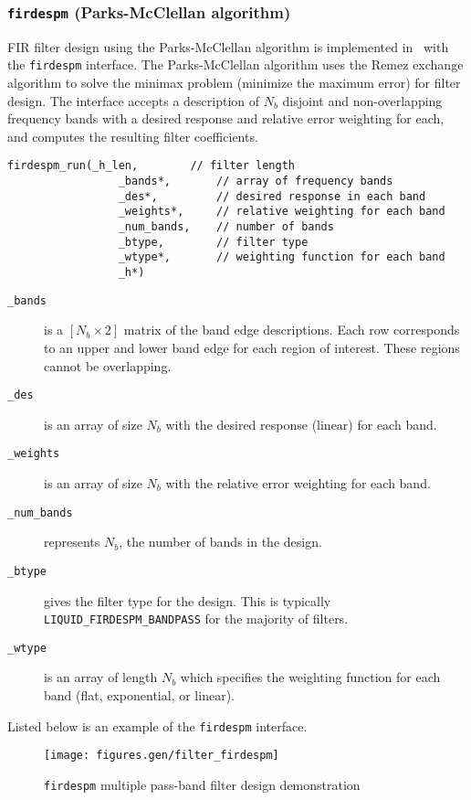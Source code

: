 \subsubsection{{\tt firdespm} (Parks-McClellan algorithm)}
\label{module:filter:firdespm}
FIR filter design using the Parks-McClellan algorithm is implemented in
\liquid\ with the {\tt firdespm} interface.
The Parks-McClellan algorithm uses the Remez exchange algorithm to solve
the minimax problem (minimize the maximum error) for filter design.
The interface accepts a description of $N_b$ disjoint and
non-overlapping frequency bands with a desired response and relative
error weighting for each, and computes the resulting filter
coefficients.
%
\begin{Verbatim}[fontsize=\small]
    firdespm_run(_h_len,        // filter length
                 _bands*,       // array of frequency bands
                 _des*,         // desired response in each band
                 _weights*,     // relative weighting for each band
                 _num_bands,    // number of bands
                 _btype,        // filter type
                 _wtype*,       // weighting function for each band
                 _h*)
\end{Verbatim}
%
\begin{description}
\item[{\tt \_bands}]
    is a $[N_b \times 2]$ matrix of the band edge descriptions.
    Each row corresponds to an upper and lower band edge for each region
    of interest.
    These regions cannot be overlapping.
\item[{\tt \_des}]
    is an array of size $N_b$ with the desired response (linear) for
    each band.
\item[{\tt \_weights}]
    is an array of size $N_b$ with the relative error weighting for each
    band.
\item[{\tt \_num\_bands}]
    represents $N_b$, the number of bands in the design.
\item[{\tt \_btype}]
    gives the filter type for the design.
    This is typically {\tt LIQUID\_FIRDESPM\_BANDPASS} for the majority
    of filters.
\item[{\tt \_wtype}]
    is an array of length $N_b$ which specifies the weighting function
    for each band (flat, exponential, or linear).
\end{description}
%
Listed below is an example of the {\tt firdespm} interface.
%



\begin{figure}
\centering
  \texttt{[image: figures.gen/filter\_firdespm]}
\caption{{\tt firdespm} multiple pass-band filter design demonstration}
\label{fig:module:filter:firdespm}
\end{figure}

